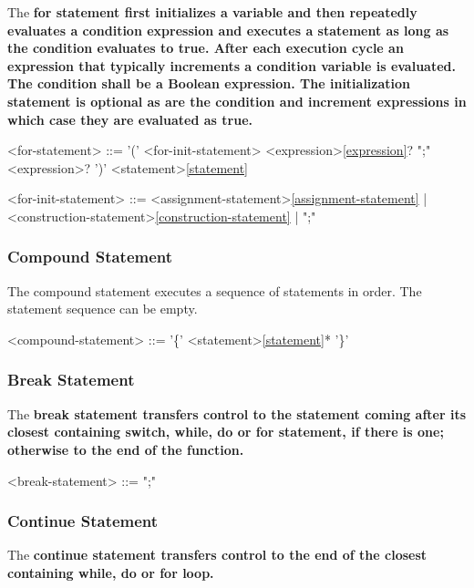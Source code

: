 \documentclass[a4paper,oneside,11pt]{article}
\begin{document}
The \bf{for} statement first initializes a variable and then
repeatedly evaluates a condition expression and executes a statement as long as the condition evaluates to \bf{true}.
After each execution cycle an expression that typically increments a condition variable is evaluated.
The condition shall be a Boolean expression.
The initialization statement is optional as are the condition and increment expressions in which case they are evaluated as \bf{true}.

\begin{grammar}
\label{for-statement}<for-statement> ::=  '(' <for-init-statement> <expression>\ref{expression}? ";" <expression>? ')' <statement>\ref{statement}

<for-init-statement> ::= <assignment-statement>\ref{assignment-statement} | <construction-statement>\ref{construction-statement} | ";"
\end{grammar}

\subsubsection{Compound Statement}

The compound statement executes a sequence of statements in order. The statement sequence can be empty.

\begin{grammar}
\label{compound-statement}<compound-statement> ::= '\{' <statement>\ref{statement}* '\}'
\end{grammar}

\subsubsection{Break Statement}

The \bf{break} statement transfers control to the statement coming after its closest containing \bf{switch}, \bf{while}, \bf{do} or \bf{for} statement,
if there is one; otherwise to the end of the function.

\begin{grammar}
\label{break-statement}<break-statement> ::=  ";"
\end{grammar}

\subsubsection{Continue Statement}

The \bf{continue} statement transfers control to the end of the closest containing \bf{while}, \bf{do} or \bf{for} loop.
\end{document}
